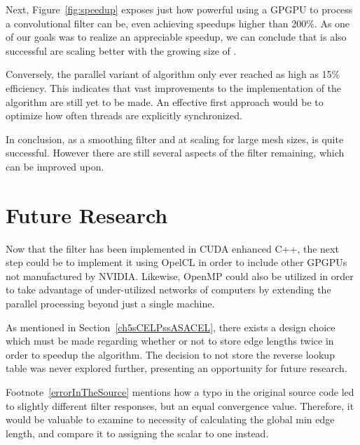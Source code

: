 Next, Figure~\ref{fig:speedup} exposes just how powerful using a GPGPU to process a convolutional filter can be, even achieving speedups higher than 200\%. As one of our goals was to realize an appreciable speedup, we can conclude that  is also successful are scaling better with the growing size of \tdd{}.

Conversely, the parallel variant of  algorithm only ever reached as high as 15\% efficiency. This indicates that vast improvements to the implementation of the algorithm are still yet to be made. An effective first approach would be to optimize how often threads are explicitly synchronized.

In conclusion, as a smoothing filter and at scaling for large mesh sizes,  is quite successful. However there are still several aspects of the filter remaining, which can be improved upon.



\section{Future Research}
Now that the filter has been implemented in CUDA enhanced C++, the next step could be to implement it using OpelCL in order to include other GPGPUs not manufactured by NVIDIA. Likewise, OpenMP could also be utilized in order to take advantage of under-utilized networks of computers by extending the parallel processing beyond just a single machine.

As mentioned in Section~\ref{ch5sCELPssASACEL}, there exists a design choice which must be made regarding whether or not to store edge lengths twice in order to speedup the algorithm. The decision to not store the reverse lookup table was never explored further, presenting an opportunity for future research.

Footnote~\ref{errorInTheSource} mentions how a typo in the original source code led to slightly different filter responses, but an equal convergence value. Therefore, it would be valuable to examine to necessity of calculating the global min edge length, and compare it to assigning the scalar to one instead.

